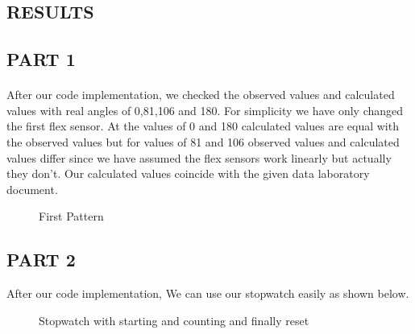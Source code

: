 \documentclass[pdftex,12pt,a4paper]{article}
\begin{document}
\begin{flushleft}
\newpage
\section{RESULTS}
\subsection{PART 1}
\paragraph{}
After our code implementation, we checked the observed values and calculated values with real angles of 0,81,106 and 180. For simplicity we have only changed the first flex sensor. At the values of 0 and 180 calculated values are equal with the observed values but for values of 81 and 106 observed values and calculated values differ since we have assumed the flex sensors work linearly but actually they don't. Our calculated values coincide with the given data laboratory document.
\begin{figure}[H]
    \centering
    \caption{First Pattern}
    \label{fig:part1-simulation}
\end{figure}


\newpage
\subsection{PART 2}
After our code implementation, We can use our stopwatch easily as shown below.

\begin{figure}[H]
    \centering
    \centering
    \caption{Stopwatch with starting and counting and finally reset}
    \label{fig:part2-right-simulation}
\end{figure}
\end{flushleft}
\end{document}
